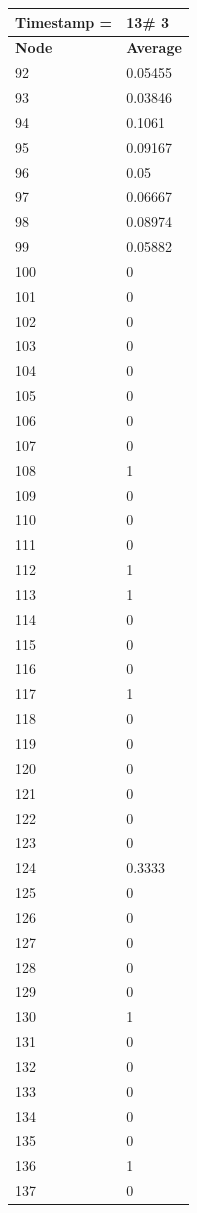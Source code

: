 \begin{tabular}{|l||l|}
\hline
\textbf{Timestamp =} & \textbf{13}\# 3\\\hline
	\textbf{Node} & \textbf{Average} \\ \hline
\hline
	92 & 0.05455 \\ \hline
	93 & 0.03846 \\ \hline
	94 & 0.1061 \\ \hline
	95 & 0.09167 \\ \hline
	96 & 0.05 \\ \hline
	97 & 0.06667 \\ \hline
	98 & 0.08974 \\ \hline
	99 & 0.05882 \\ \hline
	100 & 0 \\ \hline
	101 & 0 \\ \hline
	102 & 0 \\ \hline
	103 & 0 \\ \hline
	104 & 0 \\ \hline
	105 & 0 \\ \hline
	106 & 0 \\ \hline
	107 & 0 \\ \hline
	108 & 1 \\ \hline
	109 & 0 \\ \hline
	110 & 0 \\ \hline
	111 & 0 \\ \hline
	112 & 1 \\ \hline
	113 & 1 \\ \hline
	114 & 0 \\ \hline
	115 & 0 \\ \hline
	116 & 0 \\ \hline
	117 & 1 \\ \hline
	118 & 0 \\ \hline
	119 & 0 \\ \hline
	120 & 0 \\ \hline
	121 & 0 \\ \hline
	122 & 0 \\ \hline
	123 & 0 \\ \hline
	124 & 0.3333 \\ \hline
	125 & 0 \\ \hline
	126 & 0 \\ \hline
	127 & 0 \\ \hline
	128 & 0 \\ \hline
	129 & 0 \\ \hline
	130 & 1 \\ \hline
	131 & 0 \\ \hline
	132 & 0 \\ \hline
	133 & 0 \\ \hline
	134 & 0 \\ \hline
	135 & 0 \\ \hline
	136 & 1 \\ \hline
	137 & 0 \\ \hline
\end{tabular}


